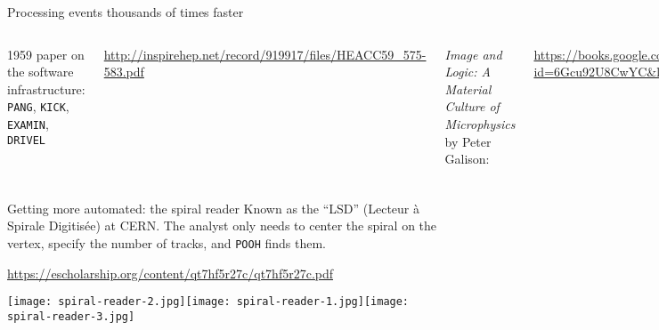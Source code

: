 \documentclass[aspectratio=169]{beamer}
\begin{document}
\begin{frame}{Processing events thousands of times faster}
\vspace{0.35 cm}
\begin{columns}
1959 paper on the software infrastructure: {\tt PANG}, {\tt KICK}, {\tt EXAMIN}, {\tt DRIVEL}

\small
\vspace{0.2 cm}
\textcolor{blue}{\url{http://inspirehep.net/record/919917/files/HEACC59_575-583.pdf}}

\normalsize
\vspace{0.4 cm}
{\it Image and Logic: A Material Culture of Microphysics} by Peter Galison:

\small
\vspace{0.2 cm}
\textcolor{blue}{\url{https://books.google.com/books?id=6Gcu92U8CwYC\&lpg=PA373\&ots=8YV5cPePE6\&dq=Franckenstein\%20bubble\&pg=PA373\#v=onepage\&q=Franckenstein\&f=false}}

\normalsize
\vspace{0.4 cm}
{\it Discovering Alvarez: Selected Works of Luis W. Alvarez}: that plot $\longrightarrow$

\texttt{[image: scaleup.png]}
\end{columns}
\end{frame}

\begin{frame}{Getting more automated: the spiral reader}
\vspace{0.35 cm}
Known as the ``LSD'' (Lecteur \`a Spirale Digitis\'ee) at CERN. The analyst only needs to center the spiral on the vertex, specify the number of tracks, and {\tt POOH} finds them.

\small
\vspace{0.2 cm}
\textcolor{blue}{\url{https://escholarship.org/content/qt7hf5r27c/qt7hf5r27c.pdf}}

\vspace{0.5 cm}
\texttt{[image: spiral-reader-2.jpg]}\hspace{0.2 cm}\texttt{[image: spiral-reader-1.jpg]}\hspace{0.2 cm}\texttt{[image: spiral-reader-3.jpg]}

\end{frame}
\end{document}

